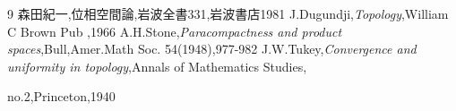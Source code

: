 \documentclass[leqno]{jsarticle}
\begin{document}
\begin{thebibliography}{9}
森田紀一,位相空間論,岩波全書331,岩波書店1981
J.Dugundji,{\it Topology},William C Brown Pub ,1966
A.H.Stone,{\it Paracompactness and product spaces},Bull,Amer.Math Soc. 54(1948),977-982
J.W.Tukey,{\it Convergence and uniformity in topology},Annals of Mathematics Studies, \par no.2,Princeton,1940

\end{thebibliography}










			
\end{document}

